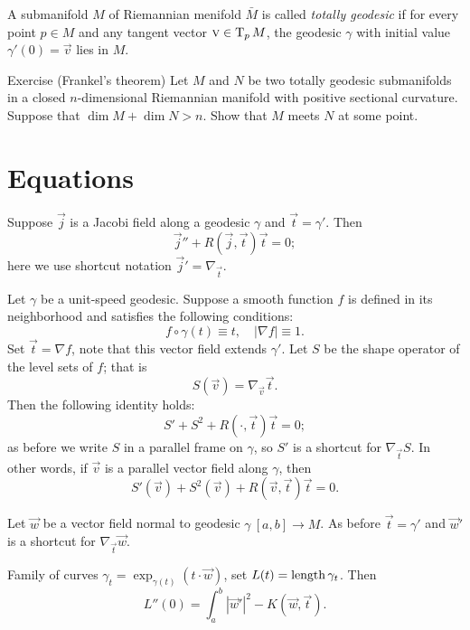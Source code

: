 A submanifold $M$ of Riemannian menifold $\bar M$ is called \emph{totally geodesic} if for every point $p\in M$ and any tangent vector $\textsc v\in\operatorname{\rm T}_pM$, the geodesic $\gamma$ with initial value $\gamma'(0)=\vec v$ lies in $M$.

\begin{thm}{Exercise (Frankel's theorem)}\label{ex:frankel}
Let $M$ and $N$ be two totally geodesic submanifolds in a closed $n$-dimensional Riemannian manifold with positive sectional curvature.
Suppose that $\dim M+\dim N>n$.
Show that $M$ meets $N$ at some point.

\end{thm}

\section{Equations}

Suppose $\vec j$ is a Jacobi field along a geodesic $\gamma$ and $\vec t=\gamma'$.
Then
\[\vec j''+R(\vec j,\vec t)\vec t=0;\]
here we use shortcut notation $\vec j'=\nabla_{\vec t}$.

Let $\gamma$ be a unit-speed geodesic.
Suppose a smooth function $f$ is defined in its neighborhood and satisfies the following conditions:
\[f\circ \gamma(t)\equiv t,\quad |\nabla f|\equiv 1.\]
Set $\vec t=\nabla f$, note that this vector field extends $\gamma'$.
Let $S$ be the shape operator of the level sets of $f$; that is
\[S(\vec v)=\nabla_{\vec v} \vec t.\]
Then the following identity holds:
\[S'+S^2+R(\cdot,\vec t)\vec t=0;\]
as before we write $S$ in a parallel frame on $\gamma$, so $S'$ is a shortcut for $\nabla_{\vec t}S$.
In other words, if $\vec v$ is a parallel vector field along $\gamma$, then 
\[S'(\vec v)+S^2(\vec v)+R(\vec v,\vec t)\vec t=0.\]

Let $\vec w$ be a vector field normal to geodesic $\gamma\:[a,b]\to M$.
As before $\vec t=\gamma'$ and $\vec w'$ is a shortcut for $\nabla_{\vec t}\vec w$.

Family of curves $\gamma_t=\exp_{\gamma(t)}(t\cdot \vec w)$, set $L(t)=\mathop{\rm length}\nolimits\gamma_t$.
Then 
\[L''(0)=\int_a^b|\vec w'|^2-K(\vec w,\vec t).\]
